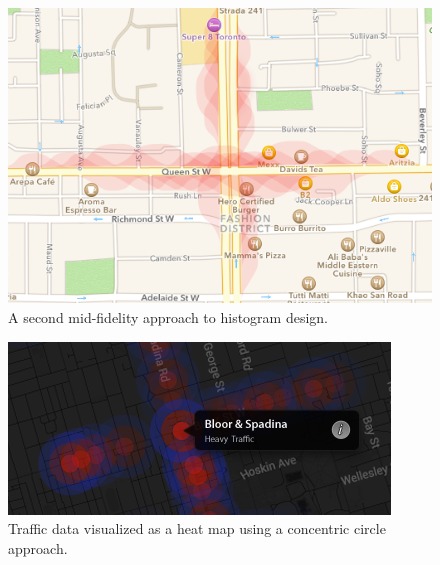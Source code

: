 \documentclass{article}
\begin{document}
\begin{figure}[htbp!]
  \begin{centering}
    \includegraphics[scale=0.77]{figures/histo-2.png}
    \caption{A second mid-fidelity approach to histogram design.}
    \label{fig:histo-2}
  \end{centering}
\end{figure}

\begin{figure}[htbp!]
  \begin{centering}
    \includegraphics[scale=1]{figures/dots-1.png}
    \caption{Traffic data visualized as a heat map using a concentric circle approach.}
    \label{fig:dots-1}
  \end{centering}
\end{figure}
\end{document}
